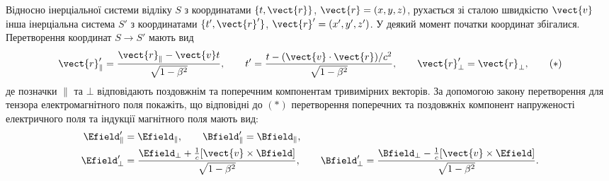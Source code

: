 \begin{problem}\label{prb:3.3} Відносно інерціальної системи відліку $S$ з координатами $\{t,\vect{r}\}$,
    $\vect{r}=(x,y,z)$, рухається зі сталою швидкістю $\vect{v}$ інша інерціальна система $S'$ з координатами
    $\{t',\vect{r}'\}$, $\vect{r}'=(x',y',z')$. У деякий момент початки координат збігалися. Перетворення координат $S\to
        S'$ мають вид
    \begin{equation*}
        \vect{r}'_{\|} = \frac{\vect{r}_{\|} - \vect{v}t}{\sqrt{1-\beta^2}},
        \qquad
        t' = \frac{t - (\vect{v}\cdot\vect{r})/c^2}{\sqrt{1-\beta^2}},
        \qquad
        \vect{r}'_{\bot} = \vect{r}_{\bot},
        \tag{$*$}
    \end{equation*}
    де позначки $\|$ та $\bot$ відповідають поздовжнім та поперечним компонентам тривимірних векторів. За допомогою закону
    перетворення для тензора електромагнітного поля покажіть, що відповідні до $(*)$ перетворення поперечних та поздовжніх
    компонент напруженості електричного поля та індукції магнітного поля мають вид:
    \begin{align*}
        \Efield'_{\|}   & = \Efield_{\|},
        \qquad
        \Bfield'_{\|} = \Bfield_{\|},                                                     \\
        \Efield'_{\bot} & = \frac{\Efield_{\bot}
                                + \tfrac{1}{c}[\vect{v}\times\Bfield]}{\sqrt{1-\beta^2}},
        \qquad
        \Bfield'_{\bot} = \frac{\Bfield_{\bot}
                              - \tfrac{1}{c}[\vect{v}\times\Efield]}{\sqrt{1-\beta^2}}.
    \end{align*}
\end{problem}

